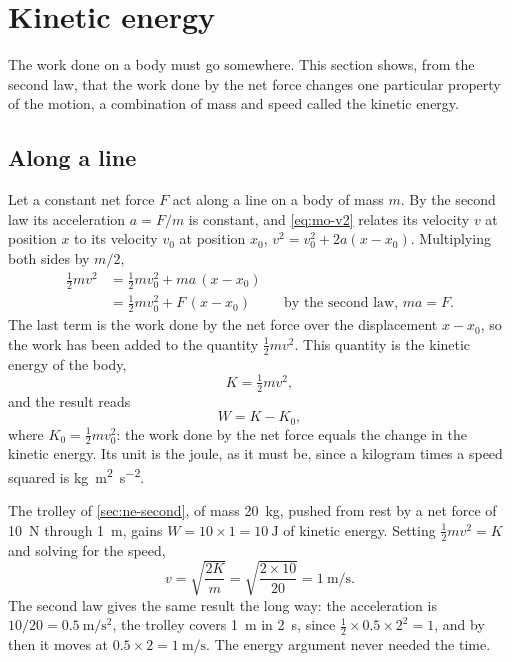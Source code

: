 \section{Kinetic energy}
\label{sec:en-kinetic}

The work done on a body must go somewhere. This section shows, from the
second law, that the work done by the net force changes one particular
property of the motion, a combination of mass and speed called the
kinetic energy.

\subsection*{Along a line}

Let a constant net force $F$ act along a line on a body of mass $m$. By
the second law its acceleration $a = F/m$ is constant, and
\cref{eq:mo-v2} relates its velocity $v$ at position $x$ to its velocity
$v_0$ at position $x_0$, $v^2 = v_0^2 + 2a(x - x_0)$. Multiplying both
sides by $m/2$,
\begin{align*}
   \tfrac12 m v^2 &= \tfrac12 m v_0^2 + m a\,(x - x_0)\\
   &= \tfrac12 m v_0^2 + F\,(x - x_0)
      && \text{by the second law, $ma = F$.}
\end{align*}
The last term is the work done by the net force over the displacement $x
- x_0$, so the work has been added to the quantity $\frac12 m v^2$. This
quantity is the kinetic energy of the body,
\begin{equation}
   K = \tfrac12 m v^2 ,
   \label{eq:en-kinetic}
\end{equation}
and the result reads
\begin{equation*}
   W = K - K_0 ,
\end{equation*}
where $K_0 = \frac12 m v_0^2$: the work done by the net force equals the
change in the kinetic energy. Its unit is the joule, as it must be, since
a kilogram times a speed squared is
\si{\kilogram\metre\squared\per\second\squared}.

The trolley of \cref{sec:ne-second}, of mass \SI{20}{\kilogram}, pushed
from rest by a net force of \SI{10}{\newton} through \SI{1}{\metre}, gains
$W = 10\times1 = \SI{10}{\joule}$ of kinetic energy. Setting $\frac12 m
v^2 = K$ and solving for the speed,
\begin{equation*}
   v = \sqrt{\frac{2K}{m}} = \sqrt{\frac{2\times10}{20}}
   = \SI{1}{\metre\per\second} .
\end{equation*}
The second law gives the same result the long way: the acceleration is
$10/20 = \SI{0.5}{\metre\per\second\squared}$, the trolley covers
\SI{1}{\metre} in \SI{2}{\second}, since $\frac12\times0.5\times2^2 = 1$,
and by then it moves at $0.5\times2 = \SI{1}{\metre\per\second}$. The
energy argument never needed the time.

